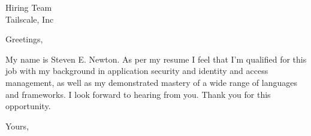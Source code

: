 \documentclass[version=last,backaddress=false,fromphone,fromemail,fromrule=aftername,fromalign=right,foldmarks=false]{scrlttr2}
\begin{document}
\begin{letter}{%
Hiring Team \\%
Tailscale, Inc
}
\opening{Greetings,}%

My name is Steven E. Newton.
As per my resume I feel that I'm qualified for this job with my background in application security and identity and access management,
as well as my demonstrated mastery of a wide range of languages and frameworks.
I look forward to hearing from you.
Thank you for this opportunity.

\closing{Yours,}
\end{letter}
\end{document}
